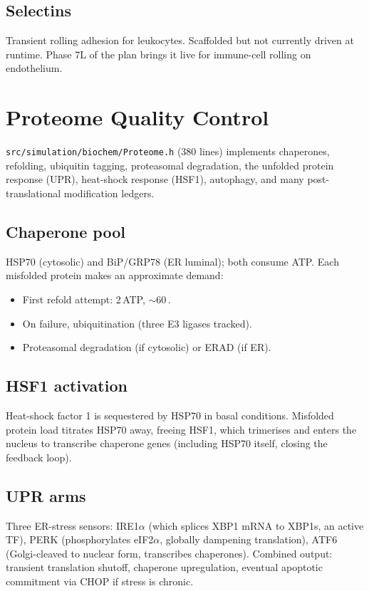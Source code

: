 \documentclass[11pt,letterpaper,twoside,openany]{book}
\newcommand{\file}[1]{\texttt{\small#1}}
\newcommand{\biosec}{\text{bio-s}}
\begin{document}
\section{Selectins}

Transient rolling adhesion for leukocytes. Scaffolded but not
currently driven at runtime. Phase 7L of the plan brings it live
for immune-cell rolling on endothelium.

\chapter{Proteome Quality Control}
\label{ch:proteome}

\file{src/simulation/biochem/Proteome.h} (380 lines) implements
chaperones, refolding, ubiquitin tagging, proteasomal degradation,
the unfolded protein response (UPR), heat-shock response (HSF1),
autophagy, and many post-translational modification ledgers.

\section{Chaperone pool}

HSP70 (cytosolic) and BiP/GRP78 (ER luminal); both consume ATP.
Each misfolded protein makes an approximate demand:
\begin{itemize}
  \item First refold attempt: 2\,ATP, $\sim$60\,\biosec.
  \item On failure, ubiquitination (three E3 ligases tracked).
  \item Proteasomal degradation (if cytosolic) or ERAD (if ER).
\end{itemize}

\section{HSF1 activation}

Heat-shock factor 1 is sequestered by HSP70 in basal conditions.
Misfolded protein load titrates HSP70 away, freeing HSF1, which
trimerises and enters the nucleus to transcribe chaperone genes
(including HSP70 itself, closing the feedback loop).

\section{UPR arms}

Three ER-stress sensors: IRE1$\alpha$ (which splices XBP1 mRNA to
XBP1s, an active TF), PERK (phosphorylates eIF2$\alpha$, globally
dampening translation), ATF6 (Golgi-cleaved to nuclear form,
transcribes chaperones). Combined output: transient translation
shutoff, chaperone upregulation, eventual apoptotic commitment via
CHOP if stress is chronic.
\end{document}
